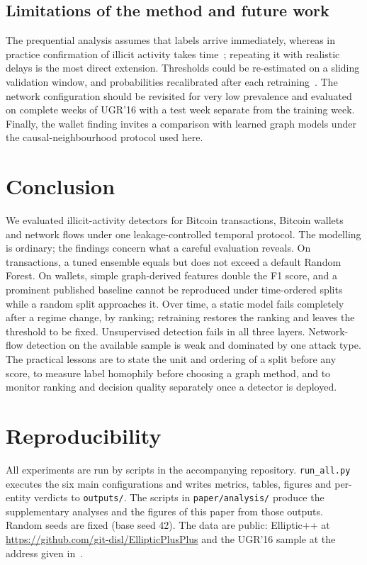 \subsection{Limitations of the method and future work}
The prequential analysis assumes that labels arrive immediately, whereas in practice confirmation of illicit activity takes time~\cite{dalpozzolo2018}; repeating it with realistic delays is the most direct extension. Thresholds could be re-estimated on a sliding validation window, and probabilities recalibrated after each retraining~\cite{niculescu2005}. The network configuration should be revisited for very low prevalence and evaluated on complete weeks of UGR'16 with a test week separate from the training week. Finally, the wallet finding invites a comparison with learned graph models under the causal-neighbourhood protocol used here.

\section{Conclusion}\label{sec:conclusion}
We evaluated illicit-activity detectors for Bitcoin transactions, Bitcoin wallets and network flows under one leakage-controlled temporal protocol. The modelling is ordinary; the findings concern what a careful evaluation reveals. On transactions, a tuned ensemble equals but does not exceed a default Random Forest. On wallets, simple graph-derived features double the F1 score, and a prominent published baseline cannot be reproduced under time-ordered splits while a random split approaches it. Over time, a static model fails completely after a regime change, by ranking; retraining restores the ranking and leaves the threshold to be fixed. Unsupervised detection fails in all three layers. Network-flow detection on the available sample is weak and dominated by one attack type. The practical lessons are to state the unit and ordering of a split before any score, to measure label homophily before choosing a graph method, and to monitor ranking and decision quality separately once a detector is deployed.

\section*{Reproducibility}
All experiments are run by scripts in the accompanying repository. \texttt{run\_all.py} executes the six main configurations and writes metrics, tables, figures and per-entity verdicts to \texttt{outputs/}. The scripts in \texttt{paper/analysis/} produce the supplementary analyses and the figures of this paper from those outputs. Random seeds are fixed (base seed 42). The data are public: Elliptic++ at \url{https://github.com/git-disl/EllipticPlusPlus} and the UGR'16 sample at the address given in~\cite{ugrsample}.
